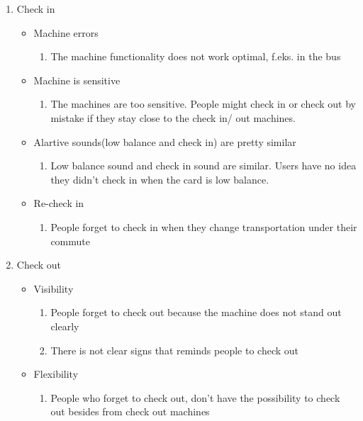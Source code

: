 \begin{enumerate}
	\item Check in
		\begin{itemize}
			
			\item Machine errors
				\begin{enumerate}
					\item The machine functionality does not work optimal, f.eks. in the bus
				\end{enumerate}
			
			\item Machine is sensitive
				\begin{enumerate}
					\item The machines are too sensitive. People might check in or check out by mistake if they stay close to the check in/ out machines.
				\end{enumerate}
			
			\item Alartive sounds(low balance and check in) are pretty similar
				\begin{enumerate}
					\item Low balance sound and check in sound are similar. Users have no idea they didn’t check in when the card is low balance.
				\end{enumerate}
				
			\item Re-check in
				\begin{enumerate}
					\item People forget to check in when they change transportation under their commute
				\end{enumerate}
		\end{itemize}
	
	\item Check out
		\begin{itemize}
			
			\item Visibility
				\begin{enumerate}
					\item People forget to check out because the machine does not stand out clearly
					\item There is not clear signs that reminds people to check out
				\end{enumerate}
			
			\item Flexibility
				\begin{enumerate}
					\item People who forget to check out, don't have the possibility to check out besides from check out machines
				\end{enumerate}
				

\end{itemize}
\end{enumerate}
